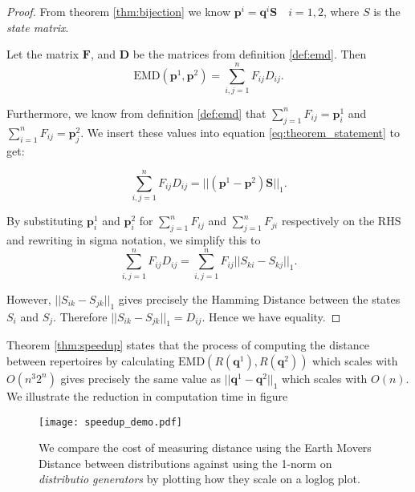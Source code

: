 \begin{proof}
	From theorem \ref{thm:bijection} we know $\mathbf{p}^i = \mathbf{q}^i \mathbf{S} \quad i = 1,2$, where $S$ is the \textit{state matrix}. 
	
	Let the matrix $\mathbf{F}$, and $\mathbf{D}$ be the matrices from definition \ref{def:emd}. Then
	\begin{equation}
	\label{proof1}
	\text{EMD}(\mathbf{p}^1, \mathbf{p}^2) = \sum \limits_{i,j = 1}^n F_{ij} D_{ij}.
	\end{equation}
	
	Furthermore, we know from definition \ref{def:emd} that $\sum \limits_{j=1}^n F_{ij} = \mathbf{p}^1_i$ and $\sum \limits_{i=1}^n F_{ij} = \mathbf{p}^2_j$.
	We insert these values into equation \ref{eq:theorem_statement} to get:
	
	\begin{equation}
	\label{proof2}
	\sum \limits_{i,j = 1}^n F_{ij} D_{ij} = || (\mathbf{p}^1 - \mathbf{p}^2)\mathbf{S}||_1.
	\end{equation}
	
	By substituting $\mathbf{p}^1_i$ and $\mathbf{p}^2_i$ for $\sum \limits_{j=1}^n F_{ij}$ and $\sum \limits_{j=1}^n F_{ji}$ respectively on the RHS and rewriting in sigma notation, we simplify this to
	\begin{equation}
	\label{proof3}
	\sum \limits_{i,j = 1}^n F_{ij} D_{ij} = \sum \limits_{i,j = 1}^n F_{ij}|| S_{ki} - S_{kj}||_1.
	\end{equation}
	
	However, $|| S_{ik} - S_{jk}||_1$ gives precisely the Hamming Distance between the states $S_i$ and $S_j$. Therefore $|| S_{ik} - S_{jk}||_1 = D_{ij}$. Hence we have equality.
\end{proof}

\begin{remark}
	Theorem \ref{thm:speedup} states that the process of computing the distance between repertoires by calculating $\text{EMD}(R(\mathbf{q}^1), R(\mathbf{q}^2))$ which scales with $O(n^3 2^n)$ gives precisely the same value as $||\mathbf{q}^1-\mathbf{q}^2||_1$ which scales with $O(n)$. We illustrate the reduction in computation time in figure
\end{remark}
	
\begin{SCfigure}
	\centering
	\texttt{[image: speedup\_demo.pdf]}
	\caption{We compare the cost of measuring distance using the Earth Movers Distance between distributions against using the 1-norm on \textit{distributio generators} by plotting how they scale on a loglog plot.}
	\label{fig:speedup_demo}
\end{SCfigure}	
	
